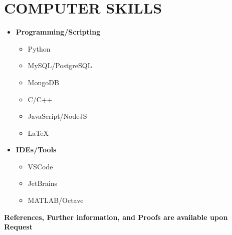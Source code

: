 \documentclass[10pt,a4paper,sans]{moderncv} %
\begin{document}
	\section{COMPUTER SKILLS}
	
	
		\begin{multicols}{2}
		\begin{itemize}
			\item \textbf{Programming/Scripting} 
			\begin{multicols}{2}
				\begin{itemize}
					\item Python
					\item MySQL/PostgreSQL
					\item MongoDB
					\item C/C++ 
					\item JavaScript/NodeJS
					\item \LaTeX 

				\end{itemize}
			\end{multicols}
			
			\item \textbf{IDEs/Tools} 
			\vspace{1em}
				\begin{itemize}
                    \item VSCode
				    \item JetBrains 
				    \item MATLAB/Octave
			    \end{itemize}
		\end{itemize}
	\end{multicols}
	
	

	\vspace{0.5em}
	\centerline{\textbf{\faExclamationCircle \hspace{0.5 pt} References, Further information, and Proofs are available upon Request}}
	
\end{document}
